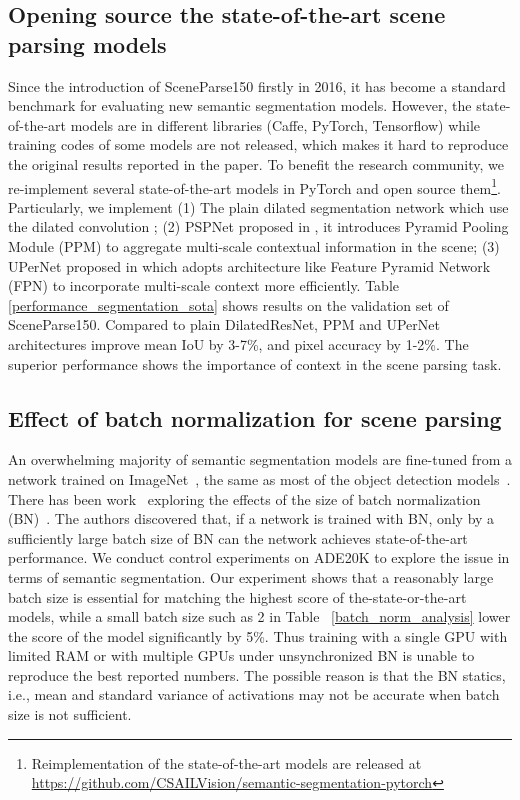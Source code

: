 \subsection{Opening source the state-of-the-art scene parsing models} Since the introduction of SceneParse150 firstly in 2016, it has become a standard benchmark for evaluating new semantic segmentation models. However, the state-of-the-art models are in different libraries (Caffe, PyTorch, Tensorflow) while training codes of some models are not released, which makes it hard to reproduce the original results reported in the paper. To benefit the research community, we re-implement several state-of-the-art models in PyTorch and open source them\footnote{Reimplementation of the state-of-the-art models are released at \url{https://github.com/CSAILVision/semantic-segmentation-pytorch}}. Particularly, we implement (1) The plain dilated segmentation network which use the dilated convolution \cite{YuKoltun2016}; (2) PSPNet proposed in \cite{zhao2017pyramid}, it introduces Pyramid Pooling Module (PPM) to aggregate multi-scale contextual information in the scene; (3) UPerNet proposed in \cite{xiao2018unified} which adopts architecture like Feature Pyramid Network (FPN) \cite{lin2017feature} to incorporate multi-scale context more efficiently. Table \ref{performance_segmentation_sota} shows results on the validation set of SceneParse150. Compared to plain DilatedResNet, PPM and UPerNet architectures improve mean IoU by 3-7\%, and pixel accuracy by 1-2\%. The superior performance shows the importance of context in the scene parsing task.

\subsection{Effect of batch normalization for scene parsing}
\label{semantic_segm_analysis}
An overwhelming majority of semantic segmentation models are fine-tuned from a network trained on ImageNet~\cite{ILSVRC15}, the same as most of the object detection models~\cite{ren2015faster,lin2017feature,he2017mask}. There has been work~\cite{peng2018megdet} exploring the effects of the size of batch normalization (BN)~\cite{ioffe2015batch}. The authors discovered that, if a network is trained with BN, only by a sufficiently large batch size of BN can the network achieves state-of-the-art performance. We conduct control experiments on ADE20K to explore the issue in terms of semantic segmentation. Our experiment shows that a reasonably large batch size is essential for matching the highest score of the-state-or-the-art models, while a small batch size such as 2 in Table ~\ref{batch_norm_analysis} lower the score of the model significantly by 5\%. Thus training with a single GPU with limited RAM or with multiple GPUs under unsynchronized BN is unable to reproduce the best reported numbers. The possible reason is that the BN statics, i.e., mean and standard variance of activations may not be accurate when batch size is not sufficient. 

